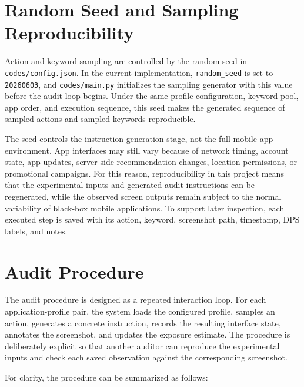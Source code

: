 \section{Random Seed and Sampling Reproducibility}
\label{subsec:random-seed}

Action and keyword sampling are controlled by the random seed in \texttt{codes/config.json}. In the current implementation, \texttt{random\_seed} is set to \texttt{20260603}, and \texttt{codes/main.py} initializes the sampling generator with this value before the audit loop begins. Under the same profile configuration, keyword pool, app order, and execution sequence, this seed makes the generated sequence of sampled actions and sampled keywords reproducible.

The seed controls the instruction generation stage, not the full mobile-app environment. App interfaces may still vary because of network timing, account state, app updates, server-side recommendation changes, location permissions, or promotional campaigns. For this reason, reproducibility in this project means that the experimental inputs and generated audit instructions can be regenerated, while the observed screen outputs remain subject to the normal variability of black-box mobile applications. To support later inspection, each executed step is saved with its action, keyword, screenshot path, timestamp, DPS labels, and notes.

\section{Audit Procedure}
\label{subsec:audit-procedure}

The audit procedure is designed as a repeated interaction loop. For each application-profile pair, the system loads the configured profile, samples an action, generates a concrete instruction, records the resulting interface state, annotates the screenshot, and updates the exposure estimate. The procedure is deliberately explicit so that another auditor can reproduce the experimental inputs and check each saved observation against the corresponding screenshot.

For clarity, the procedure can be summarized as follows:


